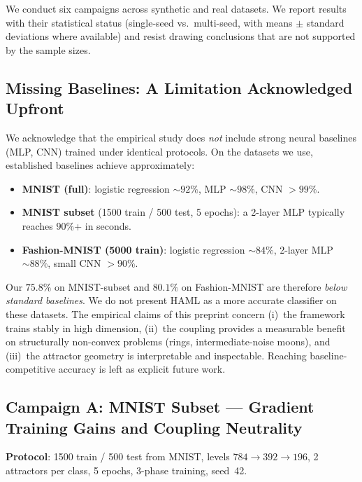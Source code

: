 \documentclass[11pt,a4paper]{article}
\begin{document}
We conduct six campaigns across synthetic and real datasets. We report results with
their statistical status (single-seed vs.\ multi-seed, with means $\pm$ standard
deviations where available) and resist drawing conclusions that are not supported by the
sample sizes.

\subsection{Missing Baselines: A Limitation Acknowledged Upfront}
\label{sec:emp:baselines}

We acknowledge that the empirical study does \emph{not} include strong neural baselines
(MLP, CNN) trained under identical protocols. On the datasets we use, established
baselines achieve approximately:
\begin{itemize}
  \item \textbf{MNIST (full)}: logistic regression $\sim 92\%$, MLP $\sim 98\%$,
        CNN $>99\%$.
  \item \textbf{MNIST subset} (1500 train / 500 test, 5 epochs): a 2-layer MLP typically
        reaches $90\%$+ in seconds.
  \item \textbf{Fashion-MNIST (5000 train)}: logistic regression $\sim 84\%$,
        2-layer MLP $\sim 88\%$, small CNN $>90\%$.
\end{itemize}
Our $75.8\%$ on MNIST-subset and $80.1\%$ on Fashion-MNIST are therefore \emph{below
standard baselines}. We do not present HAML as a more accurate classifier on these
datasets. The empirical claims of this preprint concern (i)~the framework trains stably
in high dimension, (ii)~the coupling provides a measurable benefit on structurally
non-convex problems (rings, intermediate-noise moons), and (iii)~the attractor geometry
is interpretable and inspectable. Reaching baseline-competitive accuracy is left as
explicit future work.

\subsection{Campaign A: MNIST Subset --- Gradient Training Gains and Coupling Neutrality}
\label{sec:emp:mnist}

\textbf{Protocol}: 1500 train / 500 test from MNIST, levels $784 \to 392 \to 196$,
2 attractors per class, 5 epochs, 3-phase training, seed~42.
\end{document}
